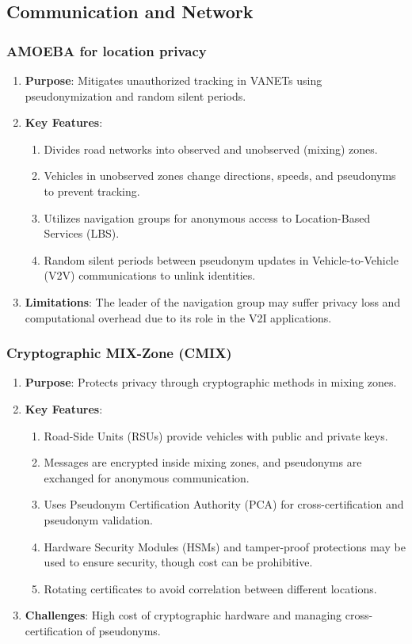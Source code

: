 \subsection{Communication and Network}\label{subsec:v2x-communication-and-network}

\subsubsection{AMOEBA for location privacy}
\begin{enumerate}
    \item \textbf{Purpose}: Mitigates unauthorized tracking in VANETs using pseudonymization and random silent periods.
    \item \textbf{Key Features}:
    \begin{enumerate}
        \item Divides road networks into observed and unobserved (mixing) zones.
        \item Vehicles in unobserved zones change directions, speeds, and pseudonyms to prevent tracking.
        \item Utilizes navigation groups for anonymous access to Location-Based Services (LBS).
        \item Random silent periods between pseudonym updates in Vehicle-to-Vehicle (V2V) communications to unlink identities.
    \end{enumerate}
    \item \textbf{Limitations}: The leader of the navigation group may suffer privacy loss and computational overhead due to its role in the V2I applications.
\end{enumerate}

\subsubsection{Cryptographic MIX-Zone (CMIX)}
\begin{enumerate}
    \item \textbf{Purpose}: Protects privacy through cryptographic methods in mixing zones.
    \item \textbf{Key Features}:
    \begin{enumerate}
        \item Road-Side Units (RSUs) provide vehicles with public and private keys.
        \item Messages are encrypted inside mixing zones, and pseudonyms are exchanged for anonymous communication.
        \item Uses Pseudonym Certification Authority (PCA) for cross-certification and pseudonym validation.
        \item Hardware Security Modules (HSMs) and tamper-proof protections may be used to ensure security, though cost can be prohibitive.
        \item Rotating certificates to avoid correlation between different locations.
    \end{enumerate}
    \item \textbf{Challenges}: High cost of cryptographic hardware and managing cross-certification of pseudonyms.
\end{enumerate}

